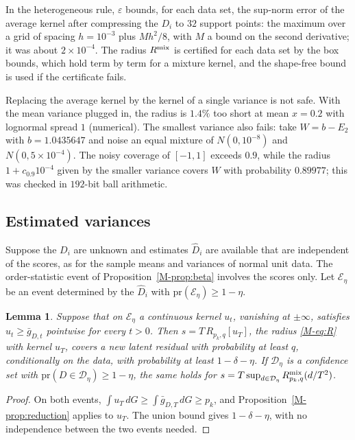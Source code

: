 \documentclass[11pt]{article}
\newtheorem{lemma}{Lemma}
\newcommand{\pr}{\mathrm{pr}}
\begin{document}
In the heterogeneous rule, $\varepsilon$ bounds, for each data set, the sup-norm error of the average kernel after compressing the $D_i$ to $32$ support points: the maximum over a grid of spacing $h = 10^{-3}$ plus $Mh^2/8$, with $M$ a bound on the second derivative; it was about $2\times10^{-4}$. The radius $R^{\rm mix}$ is certified for each data set by the box bounds, which hold term by term for a mixture kernel, and the shape-free bound is used if the certificate fails.

Replacing the average kernel by the kernel of a single variance is not safe. With the mean variance plugged in, the radius is $1.4\%$ too short at mean $x = 0.2$ with lognormal spread $1$ (numerical). The smallest variance also fails: take $W = b - E_2$ with $b = 1.0435647$ and noise an equal mixture of $N(0, 10^{-8})$ and $N(0, 5\times10^{-4})$. The noisy coverage of $[-1, 1]$ exceeds $0.9$, while the radius $1 + c_{0.9}10^{-4}$ given by the smaller variance covers $W$ with probability $0.89977$; this was checked in $192$-bit ball arithmetic.

\subsection*{Estimated variances}

Suppose the $D_i$ are unknown and estimates $\hat D_i$ are available that are independent of the scores, as for the sample means and variances of normal unit data. The order-statistic event of Proposition~\ref{M-prop:beta} involves the scores only. Let $\mathcal E_\eta$ be an event determined by the $\hat D_i$ with $\pr(\mathcal E_\eta) \ge 1 - \eta$.

\begin{lemma}\label{lem:dominate}
Suppose that on $\mathcal E_\eta$ a continuous kernel $u_t$, vanishing at $\pm\infty$, satisfies $u_t \ge \bar g_{D,t}$ pointwise for every $t > 0$. Then $s = T\,R_{p_k,q}[u_T]$, the radius \eqref{M-eq:R} with kernel $u_T$, covers a new latent residual with probability at least $q$, conditionally on the data, with probability at least $1 - \delta - \eta$. If $\mathcal D_\eta$ is a confidence set with $\pr(D \in \mathcal D_\eta) \ge 1 - \eta$, the same holds for $s = T\sup_{d \in \mathcal D_\eta} R^{\rm mix}_{p_k,q}(d/T^2)$.
\end{lemma}

\begin{proof}
On both events, $\int u_T\,dG \ge \int \bar g_{D,T}\,dG \ge p_k$, and Proposition~\ref{M-prop:reduction} applies to $u_T$. The union bound gives $1 - \delta - \eta$, with no independence between the two events needed.
\end{proof}
\end{document}
